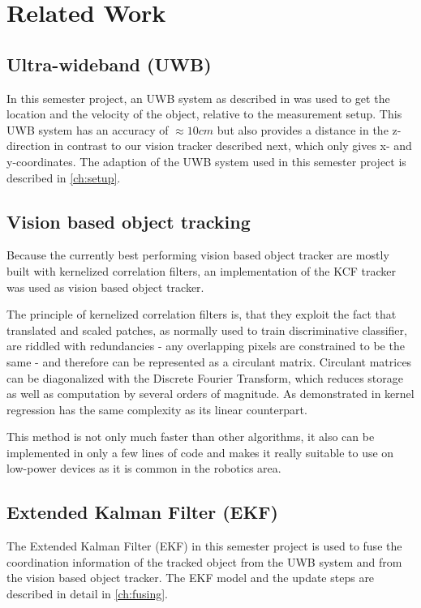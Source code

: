 
\setcounter{chapter}{1}

\chapter{Related Work}

\section{Ultra-wideband (UWB)}
In this semester project, an UWB system as described in   was used to get the location and the velocity of the object, relative to the measurement setup. This UWB system has an accuracy of $\approx 10 cm$ but also provides a distance in the z-direction in contrast to our vision tracker described next, which only gives x- and y-coordinates. The adaption of the UWB system used in this semester project is described in \autoref{ch:setup}.

\section{Vision based object tracking}
Because the currently best performing vision based object tracker are mostly built with kernelized correlation filters, an implementation of the KCF tracker \cite{henriques2015tracking} was used as vision based object tracker.

The principle of kernelized correlation filters is, that they exploit the fact that translated and scaled patches, as normally used to train discriminative classifier, are riddled with redundancies - any overlapping pixels are constrained to be the same - and therefore can be represented as a circulant matrix. Circulant matrices can be diagonalized with the Discrete Fourier Transform, which reduces storage as well as computation by several orders of magnitude. As demonstrated in \cite{henriques2015tracking} kernel regression has the same complexity as its linear counterpart.

This method is not only much faster than other algorithms, it also can be implemented in only a few lines of code and makes it really suitable to use on low-power devices as it is common in the robotics area.

\section{Extended Kalman Filter (EKF)}
The Extended Kalman Filter (EKF)  in this semester project is used to fuse the coordination information of the tracked object from the UWB system and from the vision based object tracker. The EKF model and the update steps are described in detail in \autoref{ch:fusing}.